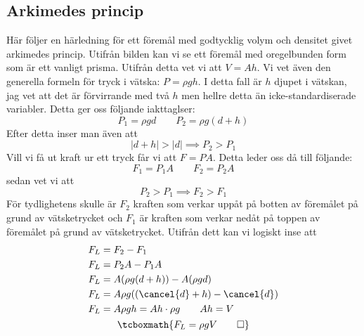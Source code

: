 \subsection{Arkimedes princip}
\label{def:arkimedes}
Här följer en härledning för ett föremål med godtycklig volym och densitet givet arkimedes princip. Utifrån bilden kan vi se ett föremål med oregelbunden form som är ett vanligt prisma. Utifrån detta vet vi att $V = Ah$. Vi vet även den generella formeln för tryck i vätska: $P = \rho gh$. I detta fall är $h$ djupet i vätskan, jag vet att det är förvirrande med två $h$ men hellre detta än icke-standardiserade variabler. Detta ger oss följande iakttaglser:
\begin{equation*}
    P_1 = \rho gd \qquad P_2 = \rho g(d+h)
\end{equation*}
Efter detta inser man även att
\begin{equation*}
    |d+h| > |d| \implies P_2 > P_1
\end{equation*}
Vill vi få ut kraft ur ett tryck får vi att $F = PA$. Detta leder oss då till följande:
\begin{equation*}
    F_1 = P_1A \qquad F_2 = P_2A
\end{equation*}
sedan vet vi att
\begin{equation*}
    P_2 > P_1 \implies F_2 > F_1
\end{equation*}
För tydlighetens skulle är $F_2$ kraften som verkar uppåt på botten av föremålet på grund av vätsketrycket och $F_1$ är kraften som verkar nedåt på toppen av föremålet på grund av vätsketrycket. Utifrån dett kan vi logiskt inse att
\begin{gather*}
    \begin{aligned}
        F_L &= F_2 - F_1 \\
        F_L &= P_2A - P_1A \\
        F_L &= A(\rho g(d+h)) - A(\rho gd) \\
        F_L &= A\rho g((\cancel{d}+h)-\cancel{d}) \\
        F_L &= A\rho gh = Ah \cdot \rho g \qquad Ah = V
    \end{aligned} \\
    \tcboxmath{F_L = \rho gV \qed}
\end{gather*}
